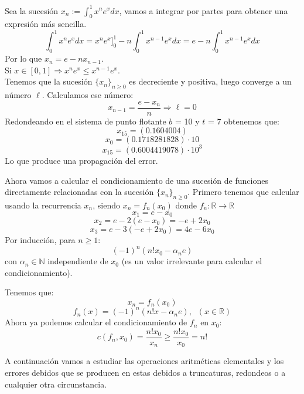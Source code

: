 \begin{ejemplo}
Sea la sucesión $x_n := \int_0^1 x^ne^x dx$, vamos a integrar por partes para obtener una expresión más sencilla.
\[ \int_0^1 x^ne^x dx = x^ne^x ]_0^1 - n \int_0^1 x^{n-1}e^x dx = e - n \int_0^1 x^{n-1}e^x dx \]
Por lo que $x_n = e - nx_{n-1}$.\\
Si $x \in [0,1] \Rightarrow x^ne^x \leq x^{n-1}e^x$.\\
Tenemos que la sucesión $\lbrace x_n \rbrace _{n \geq 0}$ es decreciente y positiva, luego converge a un número $\ell$. Calculamos ese número:
\[ x_{n-1} = \frac{e - x_n}{n} \Rightarrow \ell = 0 \]
Redondeando en el sistema de punto flotante $b$ = 10 y $t$ = 7 obtenemos que:
\[ x_{15} = (0.1604004) \]
\[ x_0 = (0.1718281828) \cdot 10 \]
\[ x_{15} = (0.6004419078) \cdot 10^3 \]
Lo que produce una propagación del error.

Ahora vamos a calcular el condicionamiento de una sucesión de funciones directamente relacionadas con la sucesión $\lbrace x_n \rbrace _{n \geq 0}$. Primero tenemos que calcular usando la recurrencia $x_n$, siendo $x_n = f_n (x_0)$ donde $f_n : \mathbb{R} \rightarrow \mathbb{R}$
\[ x_1 = e - x_0 \]
\[ x_2 = e - 2(e - x_0) = -e + 2x_0 \]
\[ x_3 = e - 3(-e + 2x_0) = 4e - 6x_0 \]
Por inducción, para $n \geq 1$:
\[ (-1)^n(n!x_0 - \alpha _n e) \]
con $\alpha _n \in \mathbb{N}$ independiente de $x_0$ (es un valor irrelevante para calcular el condicionamiento).

Tenemos que:
\[ x_n = f_n (x_0) \]
\[ f_n (x) = (-1)^n(n!x - \alpha _ne), \; \; (x \in \mathbb{R}) \]
Ahora ya podemos calcular el condicionamiento de $f_n$ en $x_0$:
\[ c(f_n,x_0) = \frac{n!x_0}{x_n} \geq \frac{n!x_0}{x_0} = n! \]
\end{ejemplo}

A continuación vamos a estudiar las operaciones aritméticas elementales y los errores debidos que se producen en estas debidos a truncaturas, redondeos o a cualquier otra circunstancia.

